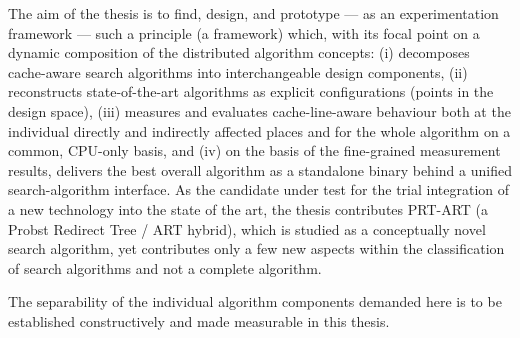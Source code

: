 The aim of the thesis is to find, design, and prototype --- as an experimentation framework --- such
a principle (a framework) which, with its focal point on a dynamic composition of the distributed
algorithm concepts: (i) decomposes cache-aware search algorithms into interchangeable
design components, (ii) reconstructs state-of-the-art algorithms as explicit configurations (points
in the design space), (iii) measures and evaluates cache-line-aware behaviour both at the individual
directly and indirectly affected places and for the whole algorithm on a common, CPU-only basis, and
(iv) on the basis of the fine-grained measurement results, delivers the best overall algorithm as a
standalone binary behind a unified search-algorithm interface. As the candidate under test for the trial integration
of a new technology into the state of the art, the thesis contributes \mbox{PRT-ART} (a Probst
Redirect Tree / ART hybrid), which is studied as a conceptually novel search algorithm, yet
contributes only a few new aspects within the classification of search algorithms and not a complete
algorithm.

The separability of the individual algorithm components demanded here is to be established
constructively and made measurable in this thesis.

